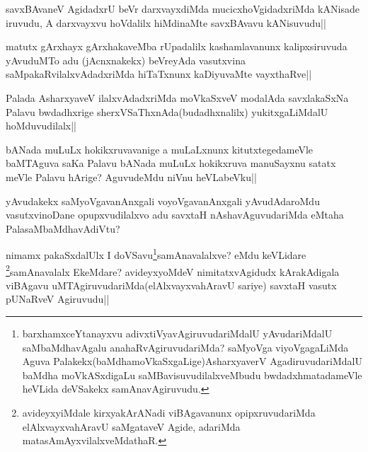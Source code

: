 \begin{artha}
savxBAvaneV AgidadxrU beVr darxvayxdiMda mucicxhoVgidadxriMda kANisade iruvudu, A darxvayxvu hoVdalilx hiMdinaMte savxBAvavu kANisuvudu||
\end{artha}

\begin{artha}
matutx gArxhayx gArxhakaveMba rUpadalilx kashamlavanunx kalipxsiruvuda yAvuduMTo adu (jAcnxnakekx) beVreyAda vasutxvina saMpakaRvilalxvAdadxriMda hiTaTxnunx kaDiyuvaMte vayxthaRve||
\end{artha}

\begin{artha}
Palada AsharxyaveV ilalxvAdadxriMda moVkaSxveV modalAda savxlakaSxNa Palavu bwdadhxrige sherxVSaThxnAda(budadhxnalilx) yukitxgaLiMdalU hoMduvudilalx||
\end{artha}

\begin{artha}
bANada muLuLx hokikxruvavanige a muLaLxnunx kitutxtegedameVle baMTAguva saKa Palavu bANada muLuLx hokikxruva manuSayxnu satatx meVle Palavu hArige? AguvudeMdu niVnu heVLabeVku||
\end{artha}

\begin{artha}
yAvudakekx saMyoVgavanAnxgali voyoVgavanAnxgali yAvudAdaroMdu vasutxvinoDane opupxvudilalxvo adu savxtaH nAshavAguvudariMda eMtaha PalasaMbaMdhavAdiVtu?
\end{artha}

\begin{artha}
nimamx pakaSxdalUlx I doVSavu\footnote{barxhamxceYtanayxvu adivxtiVyavAgiruvudariMdalU yAvudariMdalU saMbaMdhavAgalu anahaRvAgiruvudariMda? saMyoVga viyoVgagaLiMda Aguva Palakekx(baMdhamoVkaSxgaLige)AsharxyaverV AgadiruvudariMdalU baMdha moVkASxdigaLu saMBavisuvudilalxveMbudu bwdadxhmatadameVle heVLida deVSakekx samAnavAgiruvudu.}samAnavalalxve? eMdu keVLidare \footnote{avideyxyiMdale kirxyakArANadi viBAgavanunx opipxruvudariMda elAlxvayxvahAravU saMgataveV Agide, adariMda matasAmAyxvilalxveMdathaR.}samAnavalalx EkeMdare? avideyxyoMdeV nimitatxvAgidudx kArakAdigala viBAgavu uMTAgiruvudariMda(elAlxvayxvahAravU sariye) savxtaH vasutx pUNaRveV Agiruvudu||
\end{artha}


